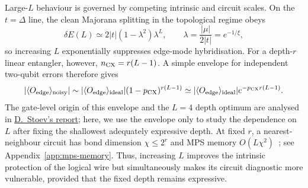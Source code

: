 Large-$L$ behaviour is governed by competing intrinsic and circuit scales.
On the $t=\Delta$ line, the clean Majorana splitting in the topological regime
obeys~\cite{kitaev2001,leumer2020}
\begin{equation}
 \delta E(L)\simeq2|t|(1-\lambda^2)\lambda^L,
 \qquad \lambda=\frac{|\mu|}{2|t|}=e^{-1/\xi},
 \label{eq:intrinsic-scaling}
\end{equation}
so increasing $L$ exponentially suppresses edge-mode hybridisation. For a
depth-$r$ linear entangler, however, $n_{\rm CX}=r(L-1)$. A simple envelope for
independent two-qubit errors therefore gives
\begin{equation}
 |\langle O_{\mathrm{edge}}\rangle_{\rm noisy}|\sim|\langle O_{\mathrm{edge}}\rangle_{\rm ideal}|
 (1-p_{\rm CX})^{r(L-1)}\simeq|\langle O_{\mathrm{edge}}\rangle_{\rm ideal}|
 e^{-p_{\rm CX}r(L-1)}.
 \label{eq:circuit-scaling}
\end{equation}
The gate-level origin of this envelope and the $L=4$ depth optimum are analysed
in \href{https://edhar98.github.io/majorana-modes-machine/reports/Dobromir_Stoev/report.pdf}{D.~Stoev's report};
here, we use the envelope only to study the dependence on $L$ after fixing the
shallowest adequately expressive depth.
At fixed $r$, a nearest-neighbour circuit has bond dimension
$\chi\leq2^r$ and MPS memory $O(L\chi^2)$~\cite{schollwoeck2011}; see
Appendix~\ref{app:mps-memory}. Thus, increasing $L$ improves the intrinsic
protection of the logical wire but simultaneously makes its circuit diagnostic
more vulnerable, provided that the fixed depth remains expressive.
